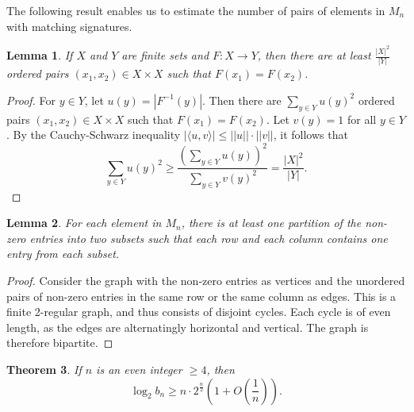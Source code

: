 \documentclass{article}
\newtheorem{theorem}{Theorem}[section]
\newtheorem{lemma}[theorem]{Lemma}
\theoremstyle{definition}
\theoremstyle{remark}
\theoremstyle{definition}
\begin{document}
The following result enables us to estimate the number of pairs of elements in $M_n$ with matching signatures.

\begin{lemma}\label{cauchy}
If $X$ and $Y$ are finite sets and $F:X \to Y$, then there are at least $\frac{|X|^2}{|Y|}$ ordered pairs $(x_1, x_2) \in X \times X$ such that $F(x_1)=F(x_2)$.
\end{lemma}

\begin{proof}
For $y \in Y$, let $u(y) = |F^{-1}(y)|$. Then there are $\sum_{y \in Y} u(y)^2$ ordered pairs $(x_1, x_2) \in X \times X$ such that $F(x_1) = F(x_2)$. Let $v(y) = 1$ for all $y \in Y$. By the Cauchy-Schwarz inequality $|\langle u, v \rangle | \leq ||u|| \cdot ||v||$, it follows that $$\sum_{y \in Y} u(y)^2 \geq \frac{\left(\sum_{y \in Y} u(y) \right)^2}{\sum_{y \in Y} v(y)^2} = \frac{|X|^2}{|Y|}.$$
\end{proof}

\begin{lemma}\label{signs}
For each element in $M_n$, there is at least one partition of the non-zero entries into two subsets such that each row and each column contains one entry from each subset.
\end{lemma}

\begin{proof}
Consider the graph with the non-zero entries as vertices and the unordered pairs of non-zero entries in the same row or the same column as edges. This is a finite 2-regular graph, and thus consists of disjoint cycles. Each cycle is of even length, as the edges are alternatingly horizontal and vertical. The graph is therefore bipartite.
\end{proof}

\begin{theorem}
If $n$ is an even integer $\geq 4$, then
\begin{equation}\label{mainresult}
\operatorname{log}_2 b_n \geq n \cdot2^{\frac{n}{2}} \left(1 + O\left(\frac{1}{n}\right) \right).
\end{equation}
\end{theorem}
\end{document}
